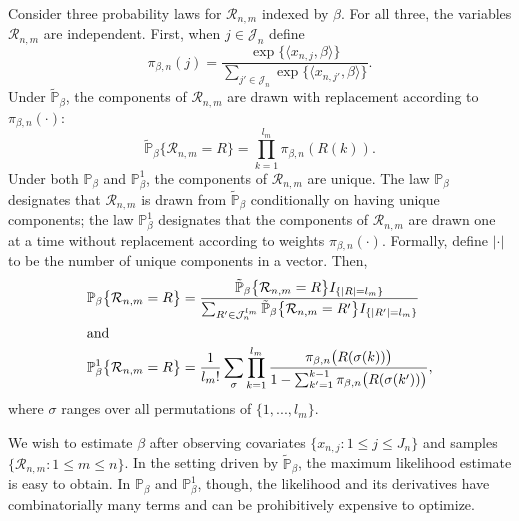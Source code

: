 \documentclass[aoas,preprint]{imsart}
\begin{document}
Consider three probability laws for $\mathcal{R}_{n,m}$ indexed by
$\beta$.  For all three, the variables $\mathcal{R}_{n,m}$ are independent.
First, when $j \in \mathcal{J}_n$ define
\[
    \pi_{\beta, n}(j)
    =
    \frac{\exp\big\{\langle x_{n,j}, \beta \rangle\big\}}
         {\sum_{j' \in \mathcal{J}_n}
            \exp\big\{\langle x_{n,j'}, \beta \rangle\big\}}.
\]
Under $\tilde{\mathbb{P}}_\beta$, the components of $\mathcal{R}_{n,m}$ are
drawn with replacement according to $\pi_{\beta, n}(\cdot)$:
\begin{equation}
    \tilde{\mathbb{P}}_\beta\big\{ \mathcal{R}_{n,m} = R \big\}
    =
    \prod_{k = 1}^{l_m}
        \pi_{\beta, n}(R(k)).
\end{equation}
Under both $\mathbb{P}_\beta$ and $\mathbb{P}^1_\beta$, the components
of $\mathcal{R}_{n,m}$ are unique.
The law $\mathbb{P}_\beta$ designates that 
$\mathcal{R}_{n,m}$ is drawn from $\tilde{\mathbb{P}}_\beta$
conditionally on having unique components;
the law $\mathbb{P}^1_\beta$ designates that the components of
$\mathcal{R}_{n,m}$ are drawn one at a time without replacement according to
weights $\pi_{\beta,n}(\cdot)$.  Formally, define $|\cdot|$ to be the number
of unique components in a vector.  Then,
\begin{align}
    \mathbb{P}_\beta\big\{ \mathcal{R}_{n,m} = R \big\}
        &=
        \frac{
            \tilde{\mathbb{P}}_\beta\big\{ \mathcal{R}_{n,m} = R \big\}
            I_{\{|R| = l_m\}}
        }{
            \sum_{R' \in \mathcal{J}_n^{l_m}}
                \tilde{\mathbb{P}}_\beta\big\{ \mathcal{R}_{n,m} = R' \big\}
                I_{\{|R'| = l_m\}}                
        } \\
\intertext{and}
    \mathbb{P}^1_\beta\big\{ \mathcal{R}_{n,m} = R \big\}
        &=
        \frac{1}{l_m !}
        \sum_{\sigma}
        \prod_{k=1}^{l_m}
            \frac{
                \pi_{\beta,n}\big(R(\sigma(k))\big)
            }{
                1 - \sum_{k' = 1}^{k - 1} \pi_{\beta,n}\big(R(\sigma(k'))\big)
            },
\end{align}
where $\sigma$ ranges over all permutations of $\{ 1, ..., l_m \}$.


We wish to estimate $\beta$ after observing covariates
$\{ x_{n,j} : 1 \leq j \leq J_n \}$ and samples
$\{\mathcal{R}_{n,m} : 1 \leq m \leq n\}$.  In the setting driven by
$\tilde{\mathbb{P}}_\beta$, the maximum likelihood estimate is easy to
obtain.  In $\mathbb{P}_\beta$ and $\mathbb{P}^1_\beta$, though, the
likelihood and its derivatives have combinatorially many terms
and can be prohibitively expensive to optimize.
\end{document}
